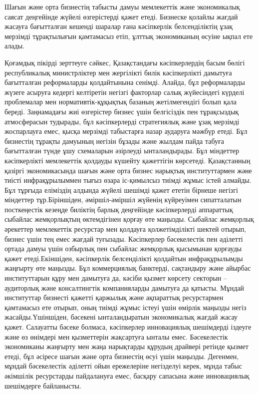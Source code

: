 \begin{multicols}{2}
Шағын және орта бизнестің табысты дамуы мемлекеттік және экономикалық
саясат деңгейінде жүйелі өзгерістерді қажет етеді. Бизнеске қолайлы
жағдай жасауға бағытталған кешенді шаралар ғана кәсіпкерлік
белсенділіктің ұзақ мерзімді тұрақтылығын қамтамасыз етіп, ұлттық
экономиканың өсуіне ықпал ете алады.

Қоғамдық пікірді зерттеуге сәйкес, Қазақстандағы кәсіпкерлердің басым
бөлігі республикалық министрліктер мен жергілікті билік кәсіпкерлікті
дамытуға бағытталған реформаларды қолдайтынына сенімді. Алайда, бұл
реформаларды жүзеге асыруға кедергі келтіретін негізгі факторлар салық
жүйесіндегі күрделі проблемалар мен нормативтік-құқықтық базаның
жетілмегендігі болып қала береді. Заңнамадағы жиі өзгерістер бизнес үшін
белгісіздік пен тұрақсыздық атмосферасын тудырады, бұл кәсіпкерлерді
стратегиялық және ұзақ мерзімді жоспарлауға емес, қысқа мерзімді
табыстарға назар аударуға мәжбүр етеді. Бұл бизнестің тұрақты дамуының
негізін бұзады және жылдам пайда табуға бағытталған түнде ұшу схемаларын
әзірлеуді ынталандырады. Бұл міндеттер кәсіпкерлікті мемлекеттік
қолдауды күшейту қажеттігін көрсетеді. Қазақстанның қазіргі
экономикасында шағын және орта бизнес нарықтық институттармен және
тиісті инфрақұрылыммен тығыз өзара іс-қимылсыз тиімді жұмыс істей
алмайды. Бұл тұрғыда еліміздің алдында жүйелі шешімді қажет ететін
бірнеше негізгі міндеттер тұр.Біріншіден, әміршіл-әміршіл жүйенің
күйреуімен сипатталатын посткеңестік кезеңде биліктің барлық деңгейінде
кәсіпкерлерді аппараттық сыбайлас жемқорлықтың өктемдігінен қорғау өте
маңызды. Сыбайлас жемқорлық әрекеттер мемлекеттік ресурстар мен қолдауға
қолжетімділікті шектей отырып, бизнес үшін тең емес жағдай туғызады.
Кәсіпкерлер бәсекелестік пен әділетті ортада дамуы үшін озбырлық пен
сыбайлас жемқорлық қысымынан қорғауды қажет етеді.Екіншіден, кәсіпкерлік
белсенділікті қолдайтын инфрақұрылымды жаңғырту өте маңызды. Бұл
коммерциялық банктерді, сақтандыру және айырбас институттарын құру мен
дамытуға да, кәсіби қызмет көрсету секторын -- аудиторлық және
консалтингтік компанияларды дамытуға да қатысты. Мұндай институттар
бизнесті қажетті қаржылық және ақпараттық ресурстармен қамтамасыз ете
отырып, оның тиімді жұмыс істеуі үшін өмірлік маңызды негіз
жасайды.Үшіншіден, бәсекені ынталандыратын экономикалық жағдай жасау
қажет. Салауатты бәсеке болмаса, кәсіпкерлер инновациялық шешімдерді
іздеуге және өз өнімдері мен қызметтерін жақсартуға ынталы емес.
Бәсекелестік экономиканы жаңғырту мен жаңа нарықтарды құрудың драйвері
ретінде қызмет етеді, бұл әсіресе шағын және орта бизнестің өсуі үшін
маңызды. Дегенмен, мұндай бәсекелестік әділетті ойын ережелеріне
негізделуі керек, мұнда табыс әкімшілік ресурстарды пайдалануға емес,
басқару сапасына және инновациялық шешімдерге байланысты.


\end{multicols}
